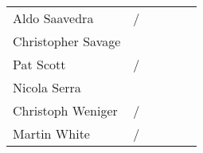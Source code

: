 \begin{center}
\begin{tabular*}{0.99\textwidth}{@{\extracolsep{\fill}}|lccccc|}
  Aldo Saavedra         & \M/\M &    & \M &    &    \\
  Christopher Savage    &       & \M &    & \C &    \\
  Pat Scott             & \C/\C & \M & \M & \M &    \\
  Nicola Serra          &       &    & \M &    & \M \\
  Christoph Weniger     & \M/\E & \M &    & \C &    \\
  Martin White          & \E/\M &    & \C &    &    \\
  \hline
\end{tabular*}
\end{center}


